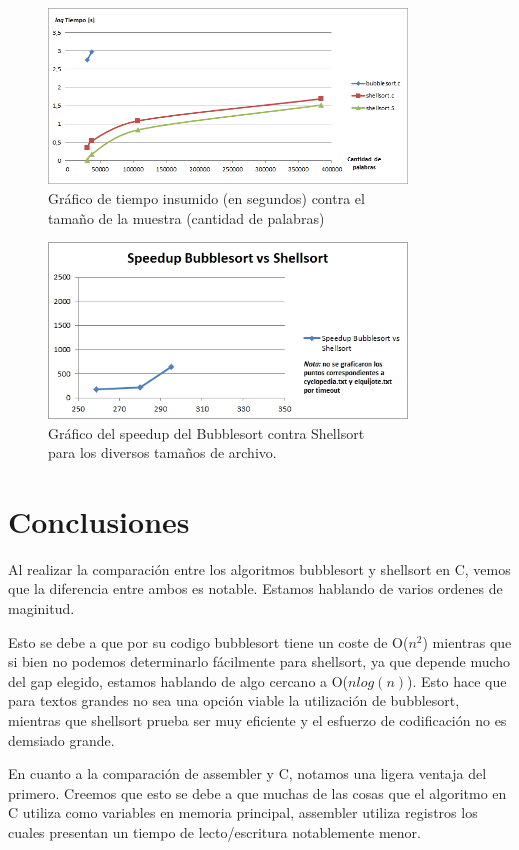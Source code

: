 \documentclass{article}
\begin{document}
\begin{figure}[h]
	\centering
	\includegraphics[width=0.85\textwidth]{images/imagen01.png}
	\medskip
	\caption{Gráfico de tiempo insumido (en segundos)  contra el\\ tamaño de la muestra (cantidad de palabras)}
\end{figure}

\newpage
\begin{figure}[h]
	\centering
	\includegraphics[width=0.85\textwidth]{images/imagen02.png}
	\medskip
	\caption{Gráfico del speedup del Bubblesort contra Shellsort\\ para los diversos tamaños de archivo.}
\end{figure}
\bigskip\bigskip


\section{Conclusiones}

	Al realizar la comparación entre los algoritmos bubblesort y shellsort en C, vemos que la diferencia entre ambos es notable. Estamos hablando de varios ordenes de maginitud.
	\par
	Esto se debe a que por su codigo bubblesort tiene un coste de O($n^2$) mientras que si bien no podemos determinarlo fácilmente para shellsort, ya que depende mucho del gap elegido, estamos hablando de algo cercano a O($n log(n)$). Esto hace que para textos grandes no sea una opción viable la utilización de bubblesort, mientras que shellsort prueba ser muy eficiente y el esfuerzo de codificación no es demsiado grande.
	\par
	En cuanto a la comparación de assembler y C, notamos una ligera ventaja del primero. Creemos que esto se debe a que muchas de las cosas que el algoritmo en C utiliza como variables en memoria principal, assembler utiliza registros los cuales presentan un tiempo de lecto/escritura notablemente menor.
\bigskip\bigskip
\end{document}
